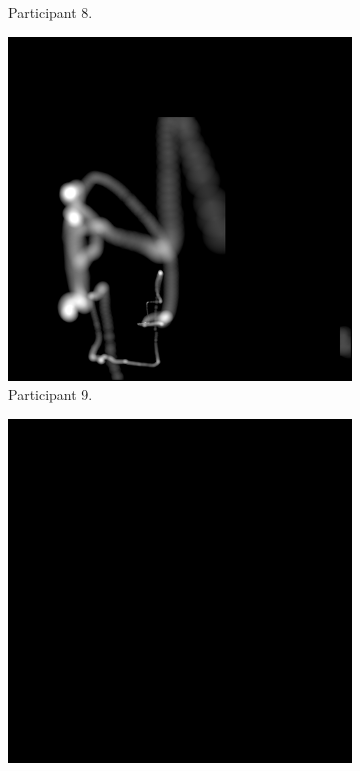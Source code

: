 \begin{figure}[!ht]
\begin{subfigure}[b]{0.24\textwidth}
        \caption{Participant 8.}
    \end{subfigure}
    \hfill    
    \begin{subfigure}[b]{0.24\textwidth}
        \centering
        \includegraphics[width=\textwidth]{img/data/Panel14/single/9.png}
        \caption{Participant 9.}
    \end{subfigure}
    \hfill    
    \begin{subfigure}[b]{0.24\textwidth}
        \centering
        \includegraphics[width=\textwidth]{img/data/Panel14/single/10.png}

\end{subfigure}
\end{figure}
